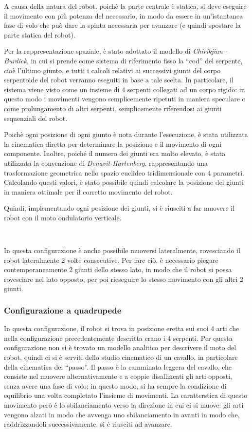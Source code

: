 \documentclass[11pt]{article} %
\begin{document}
A causa della natura del robot, poichè la parte centrale è statica, si deve eseguire il movimento con più potenza del necessario, in modo da essere in un'istantanea fase di volo che può dare la spinta necessaria per avanzare (e quindi spostare la parte statica del robot).

Per la rappresentazione spaziale, è stato adottato il modello di \textit{Chirikjian - Burdick}, in cui si prende come sistema di riferimento fisso la ``cod'' del serpente, cioè l’ultimo giunto, e tutti i calcoli relativi ai successivi giunti del corpo serpentoide del robot verranno eseguiti in base a tale scelta. In particolare, il sistema viene visto come un insieme di 4 serpenti collegati ad un corpo rigido:
in questo modo i movimenti vengono semplicemente ripetuti in maniera speculare o come prolungamento di altri serpenti, semplicemente riferendosi ai giunti sequenziali del robot.

Poichè ogni posizione di ogni giunto è nota durante l'esecuzione, è stata utilizzata la cinematica diretta per determinare la posizione e il movimento di ogni componente. Inoltre, poiché il numero dei giunti era molto elevato, è stata utilizzata la convenzione di \textit{Denavit-Hartenberg}, rappresentando una trasformazione geometrica nello spazio euclideo tridimensionale con 4 parametri.
Calcolando questi valori, è stato possibile quindi calcolare la posizione dei giunti in maniera ottimale per il corretto movimento del robot.

Quindi, implementando ogni posizione dei giunti, si è riusciti a far muovere il robot con il moto ondulatorio verticale.

~

In questa configurazione è anche possibile muoversi lateralmente, rovesciando il robot lateralmente 2 volte consecutive. Per fare ciò, è necessario piegare contemporaneamente 2 giunti dello stesso lato, in modo che il robot si possa rovesciare nel lato opposto, per poi rieseguire lo stesso movimento con gli altri 2 giunti.

\subsubsection{Configurazione a quadrupede}

In questa configurazione, il robot si trova in posizione eretta sui suoi 4 arti che nella configurazione precedentemente descritta erano i 4 serpenti. Per questa configurazione non si è trovato un modello analitico per descrivere il moto del robot, quindi ci si è serviti dello studio cinematico di un cavallo, in particolare della cinematica del ``passo''.
Il passo è la camminata leggera del cavallo, che consiste nel muovere alternativamente e a coppie disallineati gli arti opposti, senza avere una fase di volo; in questo modo, si ha sempre la condizione di equilibrio una volta completato l'insieme di movimenti. La caratterstica di questo movimento però è lo sbilanciamento verso la direzione in cui ci si muove: gli arti vengono alzati in modo che avvenga uno sbilanciamento in avanti in modo che, raddrizzandoli successivamente, si è riusciti ad avanzare.
\end{document}
